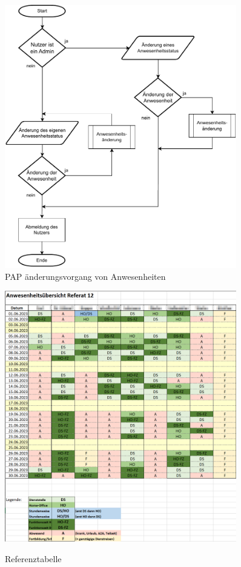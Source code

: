 \begin{figure}[htb]
    \centering
    \includegraphics[width=0.9\textwidth,angle=0]{anhang/abb/PAP_Kurz.pdf}
    \caption[Programmablaufplan]{PAP änderungsvorgang von Anwesenheiten}
    \label{abb:PAP}
\end{figure}

\begin{figure}[htb]
    \centering
    \caption[Referenztabelle]{Referenztabelle}
    \includegraphics[width=0.9\textwidth,angle=0]{anhang/abb/Tabelle.png}
    \label{abb:Ausgangstabelle}
\end{figure}

